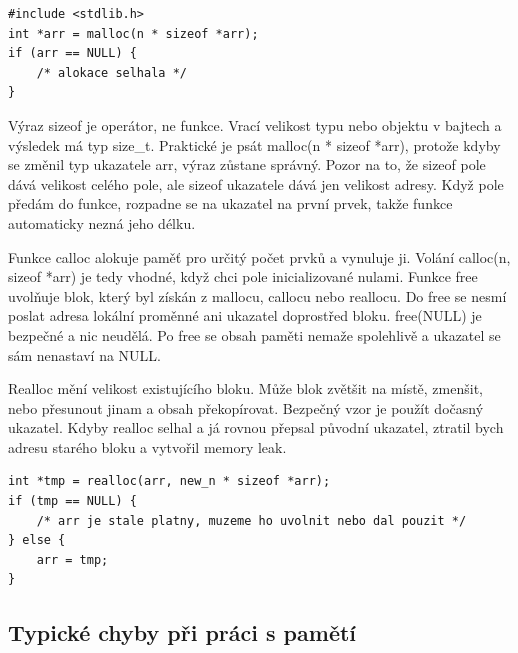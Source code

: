 \begin{codebox}
\small
\begin{verbatim}
#include <stdlib.h>
int *arr = malloc(n * sizeof *arr);
if (arr == NULL) {
    /* alokace selhala */
}
\end{verbatim}
\end{codebox}

Výraz sizeof je operátor, ne funkce. Vrací velikost typu nebo objektu v bajtech a výsledek má typ size\_t. Praktické je psát malloc(n * sizeof *arr), protože kdyby se změnil typ ukazatele arr, výraz zůstane správný. Pozor na to, že sizeof pole dává velikost celého pole, ale sizeof ukazatele dává jen velikost adresy. Když pole předám do funkce, rozpadne se na ukazatel na první prvek, takže funkce automaticky nezná jeho délku.

Funkce calloc alokuje paměť pro určitý počet prvků a vynuluje ji. Volání calloc(n, sizeof *arr) je tedy vhodné, když chci pole inicializované nulami. Funkce free uvolňuje blok, který byl získán z mallocu, callocu nebo reallocu. Do free se nesmí poslat adresa lokální proměnné ani ukazatel doprostřed bloku. free(NULL) je bezpečné a nic neudělá. Po free se obsah paměti nemaže spolehlivě a ukazatel se sám nenastaví na NULL.

Realloc mění velikost existujícího bloku. Může blok zvětšit na místě, zmenšit, nebo přesunout jinam a obsah překopírovat. Bezpečný vzor je použít dočasný ukazatel. Kdyby realloc selhal a já rovnou přepsal původní ukazatel, ztratil bych adresu starého bloku a vytvořil memory leak.

\begin{codebox}
\small
\begin{verbatim}
int *tmp = realloc(arr, new_n * sizeof *arr);
if (tmp == NULL) {
    /* arr je stale platny, muzeme ho uvolnit nebo dal pouzit */
} else {
    arr = tmp;
}
\end{verbatim}
\end{codebox}


\subsection*{Typické chyby při práci s pamětí}

